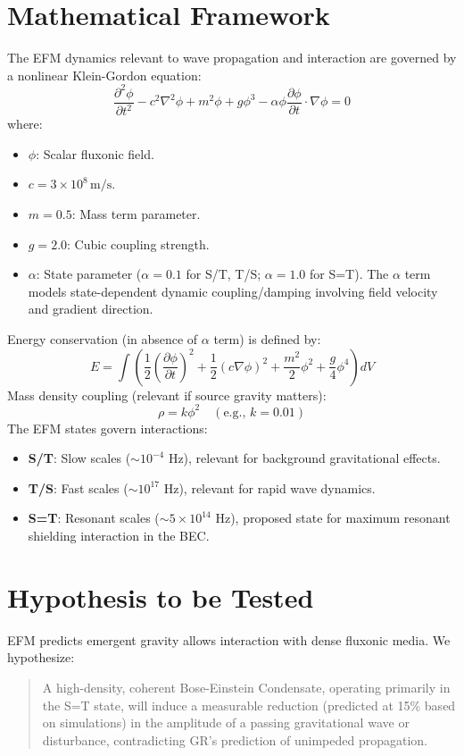 \documentclass[11pt]{article}
\begin{document}
\section{Mathematical Framework}
The EFM dynamics relevant to wave propagation and interaction are governed by a nonlinear Klein-Gordon equation:
\begin{equation}
\frac{\partial^2 \phi}{\partial t^2} - c^2 \nabla^2 \phi + m^2 \phi + g \phi^3 - \alpha \phi \frac{\partial \phi}{\partial t} \cdot \nabla \phi = 0 \label{eq:efm_shield_kge}
\end{equation}
where:
\begin{itemize}
    \item \(\phi\): Scalar fluxonic field.
    \item \(c = 3 \times 10^8 \, \text{m/s}\).
    \item \(m = 0.5\): Mass term parameter.
    \item \(g = 2.0\): Cubic coupling strength.
    \item \(\alpha\): State parameter (\(\alpha = 0.1\) for S/T, T/S; \(\alpha = 1.0\) for S=T). The \(\alpha\) term models state-dependent dynamic coupling/damping involving field velocity and gradient direction.
\end{itemize}
Energy conservation (in absence of \(\alpha\) term) is defined by:
\begin{equation}
E = \int \left( \frac{1}{2} \left(\frac{\partial \phi}{\partial t}\right)^2 + \frac{1}{2} (c \nabla \phi)^2 + \frac{m^2}{2} \phi^2 + \frac{g}{4} \phi^4 \right) dV
\end{equation}
Mass density coupling (relevant if source gravity matters):
\begin{equation}
\rho = k \phi^2 \quad (\text{e.g., } k=0.01)
\end{equation}
The EFM states govern interactions:
\begin{itemize}
    \item \textbf{S/T}: Slow scales (\(\sim 10^{-4}\) Hz), relevant for background gravitational effects.
    \item \textbf{T/S}: Fast scales (\(\sim 10^{17}\) Hz), relevant for rapid wave dynamics.
    \item \textbf{S=T}: Resonant scales (\(\sim 5\times 10^{14}\) Hz), proposed state for maximum resonant shielding interaction in the BEC.
\end{itemize}

\section{Hypothesis to be Tested}
EFM predicts emergent gravity allows interaction with dense fluxonic media. We hypothesize:
\begin{quote}
A high-density, coherent Bose-Einstein Condensate, operating primarily in the S=T state, will induce a measurable reduction (predicted at 15\% based on simulations) in the amplitude of a passing gravitational wave or disturbance, contradicting GR’s prediction of unimpeded propagation.
\end{quote}
\end{document}
